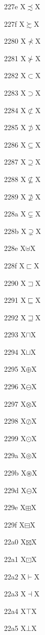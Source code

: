 \documentclass[11pt]{article}
\begin{document}
227e X{\ensuremath{\precsim}}X

227f X{\ensuremath{\succsim}}X

2280 X{\ensuremath{\nprec}}X

2281 X{\ensuremath{\nsucc}}X

2282 X{\ensuremath{\subset}}X

2283 X{\ensuremath{\supset}}X

2284 X{\ensuremath{\nsubset}}X

2285 X{\ensuremath{\nsupset}}X

2286 X{\ensuremath{\subseteq}}X

2287 X{\ensuremath{\supseteq}}X

2288 X{\ensuremath{\nsubseteq}}X

2289 X{\ensuremath{\nsupseteq}}X

228a X{\ensuremath{\subsetneq}}X

228b X{\ensuremath{\supsetneq}}X

228e X{\ensuremath{\uplus}}X

228f X{\ensuremath{\sqsubset}}X

2290 X{\ensuremath{\sqsupset}}X

2291 X{\ensuremath{\sqsubseteq}}X

2292 X{\ensuremath{\sqsupseteq}}X

2293 X{\ensuremath{\sqcap}}X

2294 X{\ensuremath{\sqcup}}X

2295 X{\ensuremath{\oplus}}X

2296 X{\ensuremath{\ominus}}X

2297 X{\ensuremath{\otimes}}X

2298 X{\ensuremath{\oslash}}X

2299 X{\ensuremath{\odot}}X

229a X{\ensuremath{\circledcirc}}X

229b X{\ensuremath{\circledast}}X

229d X{\ensuremath{\circleddash}}X

229e X{\ensuremath{\boxplus}}X

229f X{\ensuremath{\boxminus}}X

22a0 X{\ensuremath{\boxtimes}}X

22a1 X{\ensuremath{\boxdot}}X

22a2 X{\ensuremath{\vdash}}X

22a3 X{\ensuremath{\dashv}}X

22a4 X{\ensuremath{\top}}X

22a5 X{\ensuremath{\bot}}X
\end{document}
